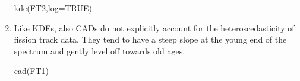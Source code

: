 \begin{refsection}
\begin{enumerate}
\begin{console}
kde(FT2,log=TRUE)
\end{console}

\item Like KDEs, also CADs do not explicitly account for the
  heteroscedasticity of fission track data. They tend to have a steep
  slope at the young end of the spectrum and gently level off towards
  old ages.

\begin{console}
cad(FT1)
\end{console}
  
\end{enumerate}

\printbibliography[heading=subbibliography]

\end{refsection}
